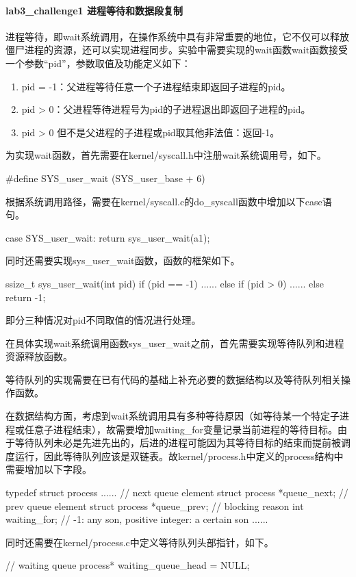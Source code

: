 \paragraph{lab3_challenge1 进程等待和数据段复制} 
进程等待，即wait系统调用，在操作系统中具有非常重要的地位，它不仅可以释放僵尸进程的资源，还可以实现进程同步。实验中需要实现的wait函数wait函数接受一个参数“pid”，参数取值及功能定义如下：
\begin{enumerate}
    \item pid = -1：父进程等待任意一个子进程结束即返回子进程的pid。
    \item pid > 0：父进程等待进程号为pid的子进程退出即返回子进程的pid。
    \item pid > 0 但不是父进程的子进程或pid取其他非法值：返回-1。
\end{enumerate}
为实现wait函数，首先需要在kernel/syscall.h中注册wait系统调用号，如下。
\begin{cppcode}
#define SYS_user_wait (SYS_user_base + 6)
\end{cppcode}
根据系统调用路径，需要在kernel/syscall.c的do_syscall函数中增加以下case语句。
\begin{cppcode}
case SYS_user_wait:
    return sys_user_wait(a1);
\end{cppcode}
同时还需要实现sys_user_wait函数，函数的框架如下。

\begin{cppcode}
ssize_t sys_user_wait(int pid) {
    if (pid == -1) {
        ......
    } else if (pid > 0) {
        ......
    } else return -1;
}
\end{cppcode}
即分三种情况对pid不同取值的情况进行处理。

在具体实现wait系统调用函数sys_user_wait之前，首先需要实现等待队列和进程资源释放函数。

等待队列的实现需要在已有代码的基础上补充必要的数据结构以及等待队列相关操作函数。

在数据结构方面，考虑到wait系统调用具有多种等待原因（如等待某一个特定子进程或任意子进程结束），故需要增加waiting_for变量记录当前进程的等待目标。由于等待队列未必是先进先出的，后进的进程可能因为其等待目标的结束而提前被调度运行，因此等待队列应该是双链表。故kernel/process.h中定义的process结构中需要增加以下字段。
\begin{cppcode}
typedef struct process {
    ......
    // next queue element
    struct process *queue_next;
    // prev queue element
    struct process *queue_prev;
    // blocking reason
    int waiting_for;        // -1: any son, positive integer: a certain son
    ......
}
\end{cppcode}
同时还需要在kernel/process.c中定义等待队列头部指针，如下。
\begin{cppcode}
// waiting queue
process* waiting_queue_head = NULL;
\end{cppcode}

